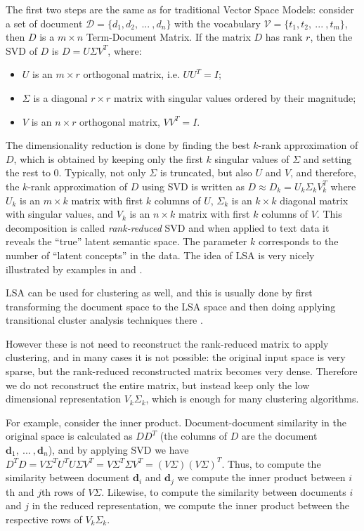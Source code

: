 The first two steps are the same as for traditional Vector Space Models:
consider a set of document $\mathcal D = \{ d_1, d_2, \ ... \ , d_n \}$
with the vocabulary $\mathcal V = \{t_1, t_2, \ ... \ , t_m \}$, then
$D$ is a $m \times n$ Term-Document Matrix. If the matrix $D$ has
rank $r$, then the SVD of $D$ is $D = U  \Sigma V^T$, where:

\begin{itemize}
\itemsep1pt\parskip0pt
\item $U$ is an $m \times r$ orthogonal matrix, i.e. $U U^T = I$;
\item $\Sigma$ is a diagonal $r \times r$ matrix with singular values ordered by their magnitude;
\item $V$ is an $n \times r$ orthogonal matrix, $V V^T = I$.
\end{itemize}

The dimensionality reduction is done by finding the best $k$-rank approximation
of $D$, which is obtained by keeping only the first $k$ singular values of $\Sigma$
and setting the rest to 0.
Typically, not only $\Sigma$ is truncated, but also $U$ and $V$,
and therefore, the $k$-rank approximation of $D$ using SVD is written as
$D \approx D_k = U_k \Sigma_k V_k^T$ where $U_k$ is an $m \times k$
matrix with first $k$ columns of $U$, $\Sigma_k$ is an $k \times k$
diagonal matrix with singular values, and $V_k$ is an $n \times k$
matrix with first $k$ columns of $V$.  This decomposition
is called \emph{rank-reduced} SVD and when applied to text data
it reveals the ``true'' latent semantic space. The parameter $k$ corresponds
to the number of ``latent concepts'' in the data. The idea 
of LSA is very nicely illustrated by examples  in 
\cite{deerwester1990indexing} and \cite{landauer1998introduction}.

LSA can be used for clustering as well, and this is usually done
by first transforming the document space to the LSA space
and then doing applying transitional cluster analysis techniques
there \cite{schutze1997projections}.

However these is not need to reconstruct the rank-reduced matrix
to apply clustering, and in many cases it is not possible:
the original input space is very sparse, but the rank-reduced
reconstructed matrix becomes very dense. Therefore we do not
reconstruct the entire matrix, but instead keep only the low
dimensional representation $V_k \Sigma_k$, which is enough
for many clustering algorithms.

For example, consider the inner product. Document-document similarity
in the original space is calculated as $D D^T$ (the columns of $D$
are the document $\mathbf d_1, \ ... \ , \mathbf d_n$), and by applying
SVD we have $D^T D = V \Sigma^T U^T U \Sigma V^T = V \Sigma^T \Sigma V^T =
(V \Sigma) (V \Sigma)^T$. Thus, to compute the similarity between
document $\mathbf d_i$ and $\mathbf d_j$ we compute the inner product
between $i$th and $j$th rows of $V \Sigma$. Likewise, to compute
the similarity between documents $i$ and $j$ in the reduced representation,
we compute the inner product between the respective rows of $V_k \Sigma_k$.

